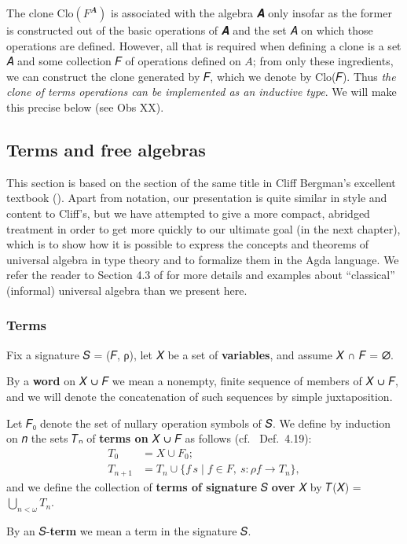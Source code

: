 \documentclass[sigplan,screen]{acmart}
\begin{document}
The clone \(\mathrm{Clo}(F^𝑨)\) is associated with the algebra 𝑨 only insofar as the former is constructed out of the basic operations of 𝑨 and the set 𝐴 on which those operations are defined. However, all that is required when defining a clone is a set 𝐴 and some collection 𝐹 of operations defined on \(A\); from only these ingredients, we can construct the clone generated by 𝐹, which we denote by Clo(𝐹). Thus \emph{the clone of terms operations can be implemented as an inductive type}. We will make this precise below (see Obs XX). %

\subsection{Terms and free algebras}\label{terms-and-free-algebras}
This section is based on the section of the same title in Cliff Bergman's excellent textbook (\cite{Bergman:2012}). Apart from notation, our presentation is quite similar in style and content to Cliff's, but we have attempted to give a more compact, abridged treatment in order to get more quickly to our ultimate goal (in the next chapter), which is to show how it is possible to express the concepts and theorems of universal algebra in type theory and to formalize them in the Agda language. We refer the reader to Section 4.3 of \cite{Bergman:2012} for more details and examples about ``classical'' (informal) universal algebra than we present here.

\subsubsection{Terms}\label{terms}
Fix a signature 𝑆 = (𝐹, ρ), let 𝑋 be a set of \textbf{variables}, and assume 𝑋 ∩ 𝐹 = ∅.

By a \textbf{word} on 𝑋 ∪ 𝐹 we mean a nonempty, finite sequence of members of 𝑋 ∪ 𝐹, and we will denote the concatenation of such sequences by simple juxtaposition.

Let 𝐹₀ denote the set of nullary operation symbols of 𝑆. We define by induction on 𝑛 the sets 𝑇ₙ of \textbf{terms on} 𝑋 ∪ 𝐹 as follows (cf.~\cite{Bergman:2012} Def.~4.19):
\[\begin{array}{rl}
  T_0 &= X ∪ F_0;\\
  T_{n+1} &= T_n ∪ \{ f\, s ∣ f ∈  F, \ s: ρf → T_n \},
  \end{array}\]
and we define the collection of \textbf{terms of signature} 𝑆 \textbf{over} 𝑋 by 𝑇(𝑋) = \(⋃_{n < ω}T_n\).

By an 𝑆-\textbf{term} we mean a term in the signature 𝑆.
\end{document}
